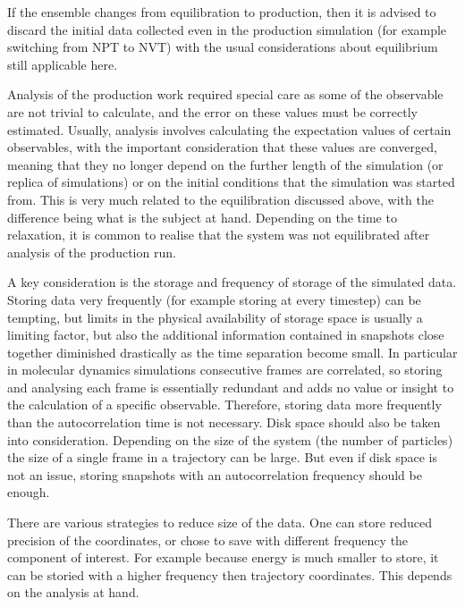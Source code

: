 If the ensemble changes from equilibration to production, then it is advised to discard the initial data collected even in the production simulation (for example switching from NPT to NVT) with the usual considerations about equilibrium still applicable here.

Analysis of the production work required special care as some of the observable are not trivial to calculate, and the error on these values must be correctly estimated. Usually, analysis involves calculating the expectation values of certain observables, with the important consideration that these values are converged, meaning that they no longer depend on the further length of the simulation (or replica of simulations) or on the initial conditions that the simulation was started from. This is very much related to the equilibration discussed above, with the difference being what is the subject at hand. Depending on the time to relaxation, it is common to realise that the system was not equilibrated after analysis of the production run.

A key consideration is the storage and frequency of storage of the simulated data. Storing data very frequently (for example storing at every timestep) can be tempting, but limits in the physical availability of storage space is usually a limiting factor, but also the additional information contained in snapshots close together diminished drastically as the time separation become small. In particular in molecular dynamics simulations consecutive frames are correlated, so storing and analysing each frame is essentially redundant and adds no value or insight to the calculation of a specific observable. Therefore, storing data more frequently than the autocorrelation time is not necessary. Disk space should also be taken into consideration. Depending on the size of the system (the number of particles) the size of a single frame in a trajectory can be large. But even if disk space is not an issue, storing snapshots with an autocorrelation frequency should be enough.

There are various strategies to reduce size of the data. One can store reduced precision of the coordinates, or chose to save with different frequency the component of interest. For example because energy is much smaller to store, it can be storied with a higher frequency then trajectory coordinates. This depends on the analysis at hand.

